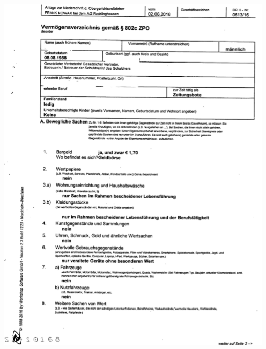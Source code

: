 \begin{minipage}{\textwidth}
  \centering
  \includegraphics{img/VVformular_teil1.PNG}
\end{minipage}

